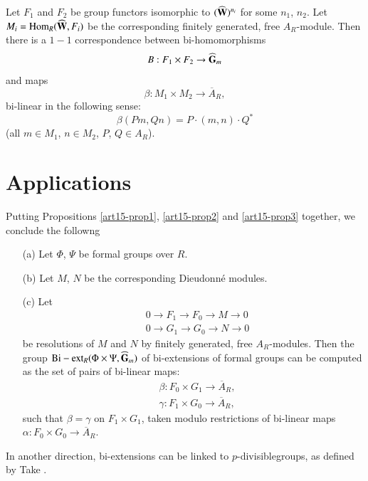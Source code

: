 \begin{coro*}
Let $F_{1}$ and $F_{2}$ be group functors isomorphic to $(\widehat{\mathbf{W}})^{n_{i}}$ for some $n_{1}$, $n_{2}$. Let $M_{i}=\operatorname{\mathrm{Hom}}_{R}(\widehat{\mathbf{W}},F_{i})$ be the corresponding finitely generated, free $A_{R}$-module. Then there is a $1-1$ correspondence between bi-homomorphisms
$$
B:F_{1}\times F_{2}\to \widehat{\mathbf{G}}_{m}
$$
and maps
$$
\beta : M_{1}\times M_{2}\to \overline{A}_{R},
$$\pageoriginale
bi-linear in the following sense:
$$
\beta (Pm,Qn)=P\cdot (m,n)\cdot Q^{*}
$$
(all $m\in M_{1}$, $n\in M_{2}$, $P$, $Q\in A_{R}$).
\end{coro*}

\section{Applications}\label{art15-sec5}

Putting Propositions \ref{art15-prop1}, \ref{art15-prop2} and \ref{art15-prop3} together, we conclude the followng

\begin{coro*}
\begin{itemize}
\item[(a)] Let $\Phi$, $\Psi$ be formal groups over $R$.

\item[(b)] Let $M$, $N$ be the corresponding Dieudonn\'e modules.

\item[(c)] Let
\begin{align*}
& 0\to F_{1}\to F_{0}\to M\to 0\\
& 0\to G_{1}\to G_{0}\to N\to 0
\end{align*}
be resolutions of $M$ and $N$ by finitely generated, free $A_{R}$-modules. Then the group ${\rm Bi-ext}_{R}(\Phi\times \Psi, \widehat{\mathbf{G}}_{m})$ of bi-extensions of formal groups can be computed as the set of pairs of bi-linear maps:
\begin{align*}
& \beta : F_{0}\times G_{1}\to \overline{A}_{R},\\
& \gamma : F_{1}\times G_{0}\to \overline{A}_{R},
\end{align*}
such that $\beta=\gamma$ on $F_{1}\times G_{1}$, taken modulo restrictions of bi-linear maps $\alpha : F_{0}\times G_{0}\to \overline{A}_{R}$.
\end{itemize}
\end{coro*}

In another direction, bi-extensions can be linked to $p$-divisible\break groups, as defined by Take \cite{art15-key6}.

